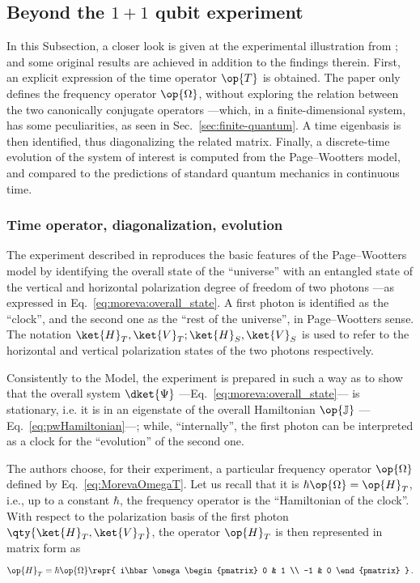 \subsection{Beyond the $1+1$ qubit experiment}\label{sec:beyondMoreva}

In this Subsection, a closer look is given at the experimental illustration from \cite{Moreva:illustration};
and some original results are achieved in addition to the findings therein.
%
First, an explicit expression of the time operator $\op{T}$
is obtained.
The \mbox{paper} \parencite{Moreva:illustration}
only defines the frequency operator $\op{\Omega}$,
without exploring the relation between the two canonically conjugate operators
---which, in a finite-dimensional system, has some peculiarities, as seen in Sec.~\ref{sec:finite-quantum}.
%
A time eigenbasis is then identified, thus diagonalizing the related matrix.
%
Finally, a discrete-time evolution of the system of interest is computed from the Page--Wootters model,
and compared to the predictions of
standard quantum mechanics in continuous time.

\subsubsection{Time operator, diagonalization, evolution}
\label{1qubitExp}

The experiment described in \citereset\cite{Moreva:illustration}
reproduces the basic features of the Page--Wootters model
by identifying the overall state of the ``universe'' with an entangled state of the vertical
and
horizontal polarization degree of freedom of two photons
---as expressed in Eq.~\eqref{eq:moreva:overall_state}.
A {first} photon is identified as the ``clock'',
and the {second} one as the ``rest of the universe'',
in Page--Wootters sense.
The notation $\ket{H}_T, \ket{V}_T; \ket{H}_S, \ket{V}_S$
is used to refer to the horizontal and vertical polarization states of the two photons respectively.

Consistently to the Model, the experiment is prepared in such a way
as to show that the overall system $\dket{\Psi}$ ---Eq.~\eqref{eq:moreva:overall_state}---
is stationary,
i.e. it is in an eigenstate of the overall Hamiltonian $\op{\mathbb{J}}$ ---Eq.~\eqref{eq:pwHamiltonian}---;
while, ``internally'', the first photon can be interpreted as a clock for the ``evolution'' of the second one.

The authors choose, for their experiment,
a particular
frequency operator $\op{\Omega}$
defined by Eq.~\eqref{eq:MorevaOmegaT}.
Let us recall that it is $\hbar\op{\Omega} = \op{H}_T$,
i.e., up to a constant $\hbar$, the frequency operator is the ``Hamiltonian of the clock''.
With respect to the polarization basis of the first photon
$\qty{\ket{H}_T, \ket{V}_T}$,
the operator $\op{H}_T$ is then represented in matrix form as
\begin{equation}\label{eq:H_T}
  \op{H}_T = \hbar\op{\Omega} \repr {
    i\hbar\omega
    \begin{pmatrix}
      0 & 1 \\
     -1 & 0
    \end{pmatrix}
  } \, \text{.}
\end{equation}

